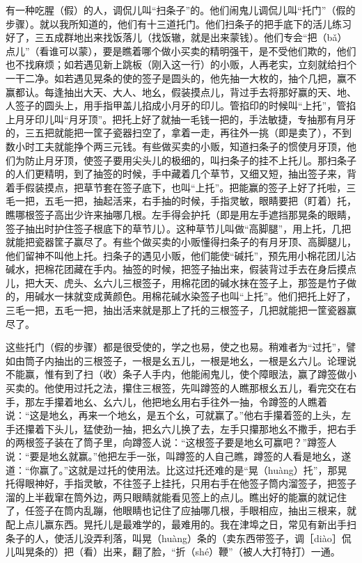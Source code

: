 \documentclass[12pt,UTF8]{ctexbook}
\begin{document}
有一种吃腥（假）的人，调侃儿叫“扫条子”的。他们闹鬼儿调侃儿叫“托门”（假的步骤）。就以我所知道的，他们有十三道托门。他们扫条子的把手底下的活儿练习好了，三五成群地出来找饭落儿（找饭辙，就是出来蒙钱）。他们专会“把（bǎ）点儿”（看谁可以蒙），要是瞧着哪个做小买卖的精明强干，是不受他们欺的，他们也不找麻烦；如若遇见新上跳板（刚入这一行）的小贩，人再老实，立刻就给扫个一干二净。如若遇见晃条的使的签子是圆头的，他先抽一大枚的，抽个几把，赢不赢都认。每逢抽出大天、大人、地幺，假装摸点儿，背过手去将那好赢的天、地、人签子的圆头上，用手指甲盖儿掐成小月牙的印儿。管掐印的时候叫“上托”，管掐上月牙印儿叫“月牙顶”。把托上好了就抽一毛钱一把的，手法敏捷，专抽那有月牙的，三五把就能把一筐子瓷器扫空了，拿着一走，再往外一挑（即是卖了），不到数小时工夫就能挣个两三元钱。有些做买卖的小贩，知道扫条子的惯使月牙顶，他们为防止月牙顶，使签子要用尖头儿的极细的，叫扫条子的挂不上托儿。那扫条子的人们更精明，到了抽签的时候，手中藏着几个草节，又细又短，抽出签子来，背着手假装摸点，把草节套在签子底下，也叫“上托”。把能赢的签子上好了托啦，三毛一把，五毛一把，抽起活来，右手抽的时候，手指灵敏，眼睛要把（盯着）托，瞧哪根签子高出少许来抽哪几根。左手得会护托（即是用左手遮挡那晃条的眼睛，签子抽出时护住签子根底下的草节儿）。这种草节儿叫做“高脚腿”，用上托，几把就能把瓷器筐子赢尽了。有些个做买卖的小贩懂得扫条子的有月牙顶、高脚腿儿，他们留神不叫他上托。扫条子的遇见小贩，他们能使“碱托”，预先用小棉花团儿沾碱水，把棉花团藏在手内。抽签的时候，把签子抽出来，假装背过手去在身后摸点儿，把大天、虎头、幺六儿三根签子，用棉花团的碱水抹在签子上，那签是竹子做的，用碱水一抹就变成黄颜色。用棉花碱水染签子也叫“上托”。他们把托上好了，三毛一把，五毛一把，抽出活来就是那上了托的三根签子，几把就能把一筐瓷器赢尽了。

这些托门（假的步骤）都是很受使的，学之也易，使之也易。稍难者为“过托”，譬如由筒子内抽出的三根签子，一根是幺五儿，一根是地幺，一根是幺六儿。论理说不能赢，惟有到了扫（收）条子人手内，他能闹鬼儿，使个障眼法，赢了蹲签做小买卖的。他使用过托之法，攥住三根签，先叫蹲签的人瞧那根幺五儿，看完交在右手，那左手攥着地幺、幺六儿，他把地幺用右手往外一抽，令蹲签的人瞧着说：“这是地幺，再来一个地幺，是五个幺，可就赢了。”他右手攥着签的上头，左手还攥着下头儿，猛使劲一抽，把幺六儿换了去，左手只攥那地幺不撒手，把右手的两根签子装在了筒子里，向蹲签人说：“这根签子要是地幺可赢吧？”蹲签人说：“要是地幺就赢。”他把左手一张，叫蹲签的人自己瞧，蹲签的人看是地幺，遂道：“你赢了。”这就是过托的使用法。比这过托还难的是“晃（huàng）托”，那晃托得眼神好，手指灵敏，不往签子上挂托，只用右手在他签子筒内溜签子，把签子溜的上半截窜在筒外边，两只眼睛就能看见签上的点儿。瞧出好的能赢的就记住了，任签子在筒内乱蹦，他眼睛也记住了应抽哪几根，手眼相应，抽出三根来，就配上点儿赢东西。晃托儿是最难学的，最难用的。我在津埠之日，常见有新出手扫条子的人，使活儿没弄利落，叫晃（huàng）条的（卖东西带签子，调［diào］侃儿叫晃条的）把（看）出来，翻了脸，“折（shé）鞭”（被人大打特打）一通。
\end{document}
